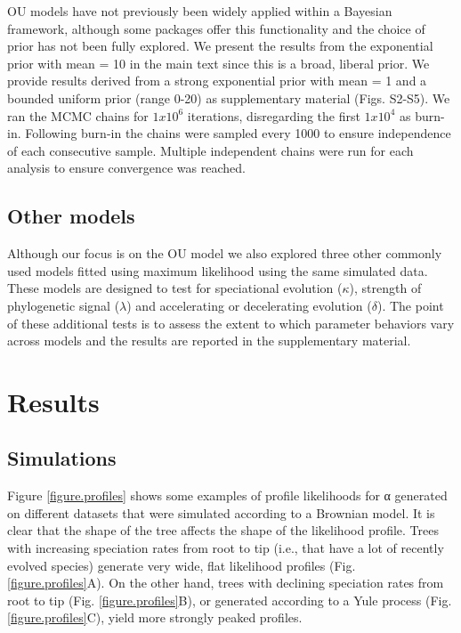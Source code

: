 \documentclass[a4paper,12pt]{article}
\begin{document}
OU models have not previously been widely applied within a Bayesian framework, although some packages offer this functionality \citep[e.g., diversitree;][]{FitzJohn:2012aa} and the choice of prior has not been fully explored. We present the results from the exponential prior with mean = 10 in the main text since this is a broad, liberal prior. We provide results derived from a strong exponential prior with mean = 1 and a bounded uniform prior (range 0-20) as supplementary material (Figs. S2-S5). We ran the MCMC chains for $1x10^6$ iterations, disregarding the first $1x10^4$ as burn-in. Following burn-in the chains were sampled every 1000 to ensure independence of each consecutive sample. Multiple independent chains were run for each analysis to ensure convergence was reached. 

\subsection{Other models}
Although our focus is on the OU model we also explored three other commonly used models \citep[$\kappa$, $\lambda$, and $\delta$;][]{Pagel:1997aa,Pagel:1999aa} fitted using maximum likelihood using the same simulated data. These models are designed to test for speciational evolution ($\kappa$), strength of phylogenetic signal ($\lambda$) and accelerating or decelerating evolution ($\delta$). The point of these additional tests is to assess the extent to which parameter behaviors vary across models and the results are reported in the supplementary material. 

\section{Results}
\subsection{Simulations}
\label{section:sims.results} 
Figure \ref{figure.profiles} shows some examples of profile likelihoods for α generated on different datasets that were simulated according to a Brownian model. It is clear that the shape of the tree affects the shape of the likelihood profile. Trees with increasing speciation rates from root to tip (i.e., that have a lot of recently evolved species) generate very wide, flat likelihood profiles (Fig. \ref{figure.profiles}A). On the other hand, trees with declining speciation rates from root to tip (Fig. \ref{figure.profiles}B), or generated according to a Yule process (Fig. \ref{figure.profiles}C), yield more strongly peaked profiles. 
\end{document}
